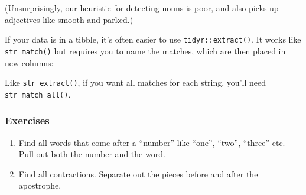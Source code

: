 \documentclass[]{book}
\newenvironment{Shaded}{\begin{snugshade}}{\end{snugshade}}
\newcommand{\KeywordTok}[1]{\textcolor[rgb]{0.13,0.29,0.53}{\textbf{{#1}}}}
\newcommand{\DataTypeTok}[1]{\textcolor[rgb]{0.13,0.29,0.53}{{#1}}}
\newcommand{\StringTok}[1]{\textcolor[rgb]{0.31,0.60,0.02}{{#1}}}
\newcommand{\CommentTok}[1]{\textcolor[rgb]{0.56,0.35,0.01}{\textit{{#1}}}}
\newcommand{\OtherTok}[1]{\textcolor[rgb]{0.56,0.35,0.01}{{#1}}}
\newcommand{\NormalTok}[1]{{#1}}
\begin{document}
(Unsurprisingly, our heuristic for detecting nouns is poor, and also
picks up adjectives like smooth and parked.)

If your data is in a tibble, it's often easier to use
\texttt{tidyr::extract()}. It works like \texttt{str\_match()} but
requires you to name the matches, which are then placed in new columns:

\begin{Shaded}
\end{Shaded}

Like \texttt{str\_extract()}, if you want all matches for each string,
you'll need \texttt{str\_match\_all()}.

\subsubsection{Exercises}\label{exercises-38}

\begin{enumerate}
\def\labelenumi{\arabic{enumi}.}
\item
  Find all words that come after a ``number'' like ``one'', ``two'',
  ``three'' etc. Pull out both the number and the word.
\item
  Find all contractions. Separate out the pieces before and after the
  apostrophe.
\end{enumerate}
\end{document}
